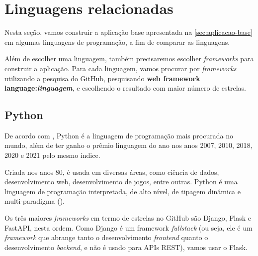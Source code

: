 \section{Linguagens relacionadas}

Nesta seção, vamos construir a aplicação base apresentada na \autoref{sec:aplicacao-base}
em algumas linguagens de programação, a fim de comparar as linguagens.

Além de escolher uma linguagem, também precisaremos escolher \textit{frameworks}
para construir a aplicação. Para cada linguagem, vamos procurar por \textit{frameworks}
utilizando a pesquisa do GitHub, pesquisando \textbf{web framework language:\textit{linguagem}},
e escolhendo o resultado com maior número de estrelas.

\subsection{Python}\label{subsec:python}

De acordo com \textcite{tiobeindex}, Python é a linguagem de programação mais procurada
no mundo, além de ter ganho o prêmio linguagem do ano nos anos 2007, 2010, 2018,
2020 e 2021 pelo mesmo índice.

Criada nos anos 80, é usada em diversas áreas, como ciência de
dados, desenvolvimento web, desenvolvimento de jogos, entre outras. Python é uma
linguagem de programação interpretada, de alto nível, de tipagem dinâmica e
multi-paradigma (\textcite{pythonmanual}).

Os três maiores \textit{frameworks} em termo de estrelas no GitHub são Django,
Flask e FastAPI, nesta ordem. Como Django é um framework \textit{fullstack} (ou seja,
ele é um \textit{framework} que abrange tanto o desenvolvimento \textit{frontend}
quanto o desenvolvimento \textit{backend}, e não é usado para APIs REST), vamos
usar o Flask.

